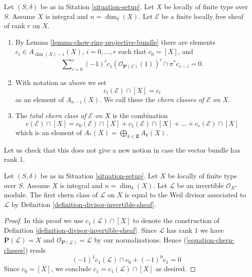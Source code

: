 \begin{definition}
\label{definition-chern-classes}
Let $(S, \delta)$ be as in Sitation \ref{situation-setup}.
Let $X$ be locally of finite type over $S$.
Assume $X$ is integral and $n = \dim_\delta(X)$.
Let $\mathcal{E}$ be a finite locally free sheaf of rank $r$ on $X$.
\begin{enumerate}
\item By Lemma \ref{lemma-chow-ring-projective-bundle} there are
elements $c_i \in A_{\dim(X) - i}(X)$, $i=0, \ldots, r$
such that $c_0 = [X]$, and
\begin{equation}
\label{equation-chern-classes}
\sum\nolimits_{i = 0}^r
(-1)^i c_1(\mathcal{O}_{\mathbf{P}(\mathcal{E})}(1))^i \cap \pi^*c_{r - i}
= 0.
\end{equation}
\item With notation as above we set
$$
c_i(\mathcal{E}) \cap [X] = c_i
$$
as an element of $A_{n - i}(X)$.
We call these the {\it chern classes of $\mathcal{E}$ on $X$}.
\item The {\it total chern class of $\mathcal{E}$ on $X$}
is the combination
$$
c({\mathcal E}) \cap [X] = 
c_0({\mathcal E}) \cap [X] + c_1({\mathcal E}) \cap [X] + \ldots
+ c_r({\mathcal E}) \cap [X]
$$
which is an element of
$A_*(X) = \bigoplus_{k \in \mathbf{Z}} A_k(X)$.
\end{enumerate}
\end{definition}

\noindent
Let us check that this does not give a new notion in case the
vector bundle has rank $1$.

\begin{lemma}
\label{lemma-first-chern-class}
Let $(S, \delta)$ be as in Situation \ref{situation-setup}.
Let $X$ be locally of finite type over $S$.
Assume $X$ is integral and $n = \dim_\delta(X)$.
Let $\mathcal{L}$ be an invertible $\mathcal{O}_X$-module.
The first chern class of $\mathcal{L}$ on $X$
is equal to the Weil divisor associated to $\mathcal{L}$
by Definition \ref{definition-divisor-invertible-sheaf}.
\end{lemma}

\begin{proof}
In this proof we use $c_1(\mathcal{L}) \cap [X]$ to denote the
construction of Definition \ref{definition-divisor-invertible-sheaf}.
Since $\mathcal{L}$ has rank $1$ we have
$\mathbf{P}(\mathcal{L}) = X$ and
$\mathcal{O}_{\mathbf{P}(\mathcal{L})} = \mathcal{L}$
by our normalizations. Hence (\ref{equation-chern-classes})
reads
$$
(-1)^1 c_1(\mathcal{L}) \cap c_0 + (-1)^0 c_1 = 0
$$
Since $c_0 = [X]$, we conclude $c_1 = c_1(\mathcal{L}) \cap [X]$
as desired.
\end{proof}

